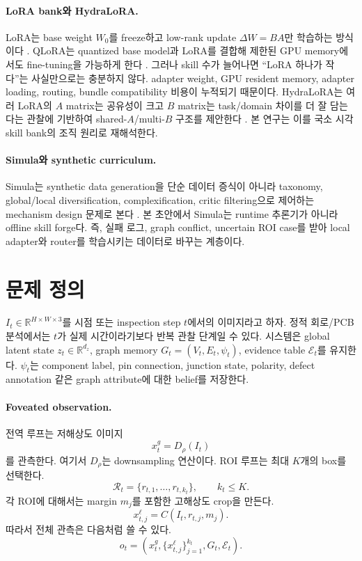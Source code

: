 \documentclass[11pt]{article}
\theoremstyle{definition}
\begin{document}
\paragraph{LoRA bank와 HydraLoRA.}
LoRA는 base weight $W_0$를 freeze하고 low-rank update $\Delta W=BA$만 학습하는 방식이다 \citep{hu2021lora}.
QLoRA는 quantized base model과 LoRA를 결합해 제한된 GPU memory에서도 fine-tuning을 가능하게 한다 \citep{dettmers2023qlora}.
그러나 skill 수가 늘어나면 ``LoRA 하나가 작다''는 사실만으로는 충분하지 않다.
adapter weight, GPU resident memory, adapter loading, routing, bundle compatibility 비용이 누적되기 때문이다.
HydraLoRA는 여러 LoRA의 $A$ matrix는 공유성이 크고 $B$ matrix는 task/domain 차이를 더 잘 담는다는 관찰에 기반하여 shared-$A$/multi-$B$ 구조를 제안한다 \citep{tian2024hydralora}.
본 연구는 이를 국소 시각 skill bank의 조직 원리로 재해석한다.

\paragraph{Simula와 synthetic curriculum.}
Simula는 synthetic data generation을 단순 데이터 증식이 아니라 taxonomy, global/local diversification, complexification, critic filtering으로 제어하는 mechanism design 문제로 본다 \citep{davidson2026simula}.
본 초안에서 Simula는 runtime 추론기가 아니라 offline skill forge다.
즉, 실패 로그, graph conflict, uncertain ROI case를 받아 local adapter와 router를 학습시키는 데이터로 바꾸는 계층이다.

\section{문제 정의}

$I_t \in \mathbb{R}^{H \times W \times 3}$를 시점 또는 inspection step $t$에서의 이미지라고 하자.
정적 회로/PCB 분석에서는 $t$가 실제 시간이라기보다 반복 관찰 단계일 수 있다.
시스템은 global latent state $z_t \in \mathbb{R}^{d_z}$, graph memory $G_t=(V_t,E_t,\psi_t)$, evidence table $\mathcal{E}_t$를 유지한다.
$\psi_t$는 component label, pin connection, junction state, polarity, defect annotation 같은 graph attribute에 대한 belief를 저장한다.

\paragraph{Foveated observation.}
전역 루프는 저해상도 이미지
\begin{equation}
  x_t^g = D_\rho(I_t)
\end{equation}
를 관측한다.
여기서 $D_\rho$는 downsampling 연산이다.
ROI 루프는 최대 $K$개의 box를 선택한다.
\begin{equation}
  \mathcal{R}_t = \{r_{t,1},\ldots,r_{t,k_t}\}, \qquad k_t \le K.
\end{equation}
각 ROI에 대해서는 margin $m_j$를 포함한 고해상도 crop을 만든다.
\begin{equation}
  x_{t,j}^{\ell} = C(I_t,r_{t,j},m_j).
\end{equation}
따라서 전체 관측은 다음처럼 쓸 수 있다.
\begin{equation}
  o_t = \left(x_t^g,\{x_{t,j}^{\ell}\}_{j=1}^{k_t},G_t,\mathcal{E}_t\right).
\end{equation}
\end{document}
